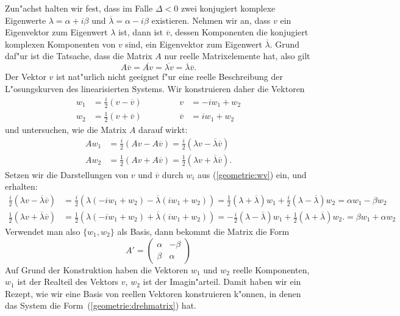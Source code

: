 Zun"achst halten wir fest, dass im Falle $\Delta<0$ zwei konjugiert
komplexe Eigenwerte
$
\lambda= \alpha + i\beta
$
und
$
\overline{\lambda}= \alpha - i\beta
$
existieren.
Nehmen wir an, dass $v$ ein Eigenvektor zum Eigenwert $\lambda$ ist,
dann ist $\overline{v}$, dessen Komponenten die konjugiert komplexen
Komponenten von $v$ sind, ein Eigenvektor zum Eigenwert $\overline{\lambda}$.
Grund daf"ur ist die Tatsache, dass die Matrix $A$ nur reelle Matrixelemente
hat, also gilt
\[
A\overline{v}
=
\overline{Av}
=
\overline{\lambda v}=\overline{\lambda}\overline{v}.
\]
Der Vektor $v$ ist nat"urlich nicht geeignet f"ur eine reelle Beschreibung
der L"osungskurven des linearisierten Systems.
Wir konstruieren daher die Vektoren
\begin{equation}
\begin{aligned}
w_1&=\frac{i}2(v-\overline v)
&&\qquad
&
v&=-iw_1+w_2
\\
w_2&=\frac12(v+\overline v)
&&\qquad
&
\overline{v}&=iw_1+w_2
\end{aligned}
\label{geometrie:wv}
\end{equation}
und untersuchen, wie die Matrix $A$ darauf wirkt:
\begin{align*}
Aw_1
&=
\frac{i}2(Av-A\overline v)
=
\frac{i}2(\lambda v-\overline{\lambda}\overline{v})
\\
Aw_2
&=
\frac12(Av+A\overline{v})
=
\frac12(\lambda v+\overline{\lambda}\overline{v}).
\end{align*}
Setzen wir die Darstellungen von $v$ und $\overline{v}$ durch $w_i$ aus 
(\ref{geometrie:wv}) ein, und erhalten:
\begin{align*}
\frac{i}2(\lambda v-\overline{\lambda}\overline{v})
&=
\frac{i}2(\lambda(-iw_1+w_2) -\overline{\lambda}(iw_1+w_2))
=
\frac{1}2(\lambda+\overline{\lambda}) w_1
+
\frac{i}2(\lambda-\overline{\lambda}) w_2
=\alpha w_1-\beta w_2
\\
\frac12(\lambda v+\overline{\lambda}\overline{v})
&=
\frac12(\lambda(-iw_1+w_2)+\overline{\lambda}(iw_1+w_2))
=
-\frac{i}2(\lambda-\overline{\lambda}) w_1
+
\frac12(\lambda+\overline{\lambda}) w_2.
=\beta w_1+\alpha w_2
\end{align*}
Verwendet man also $\{w_1,w_2\}$ als Basis, dann bekommt die Matrix die
Form
\begin{equation}
A'=\begin{pmatrix}
\alpha&-\beta\\
\beta &\alpha
\end{pmatrix}
\label{geometrie:drehmatrix}
\end{equation}
Auf Grund der Konstruktion haben die Vektoren $w_1$ und $w_2$ reelle
Komponenten, $w_1$ ist der Realteil des Vektors $v$, $w_2$ ist
der Imagin"arteil.
Damit haben wir ein Rezept, wie wir eine Basis von reellen Vektoren
konstruieren k"onnen, in denen das System die
Form~(\ref{geometrie:drehmatrix}) hat.

